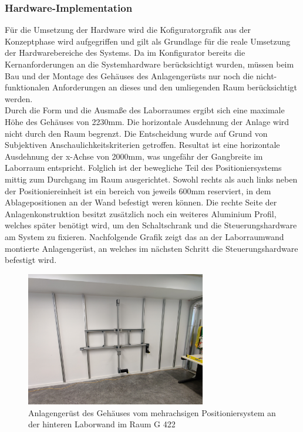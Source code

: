 \documentclass[../../../Bachelorarbeit.tex]{subfiles}
\begin{document}
\subsubsection{Hardware-Implementation} \label{Hardwareimp}
Für die Umsetzung der Hardware wird die Kofiguratorgrafik aus der Konzeptphase wird aufgegriffen und gilt als Grundlage für die reale Umsetzung der Hardwarebereiche des Systems. Da im Konfigurator bereits die Kernanforderungen an die Systemhardware berücksichtigt wurden, müssen beim Bau und der Montage des Gehäuses \bzw des Anlagengerüsts nur noch die nicht-funktionalen Anforderungen an dieses und den umliegenden Raum berücksichtigt werden.\\
Durch die Form und die Ausmaße des Laborraumes ergibt sich eine maximale Höhe des Gehäuses von 2230\si{\mm}. Die horizontale Ausdehnung der Anlage wird nicht durch den Raum begrenzt. Die Entscheidung wurde auf Grund von Subjektiven Anschaulichkeitskriterien getroffen. Resultat ist eine horizontale Ausdehnung der x-Achse von 2000\si{\mm}, was ungefähr der Gangbreite im Laborraum entspricht. Folglich ist der bewegliche Teil des Positioniersystems mittig zum Durchgang im Raum ausgerichtet. Sowohl rechts als auch links neben der Positioniereinheit ist ein bereich von jeweils 600\si{\mm} reserviert, in dem Ablagepositionen an der Wand befestigt weren können. Die rechte Seite der Anlagenkonstruktion besitzt zusätzlich noch ein weiteres Aluminium Profil, welches später benötigt wird, um den Schaltschrank und die Steuerungshardware am System zu fixieren. Nachfolgende Grafik zeigt das an der Laborraumwand montierte Anlagengerüst, an welches im nächsten Schritt die Steuerungshardware befestigt wird.

\begin{figure}[H]
    \centering
    \includegraphics[width=0.7\textwidth]{Images/Anlagengeruest.jpg}
    \caption[Anlagengerüst]{Anlagengerüst des Gehäuses vom mehrachsigen Positioniersystem an der hinteren Laborwand im Raum G 422}
    \label{fig:my-img20}
\end{figure}
\end{document}
